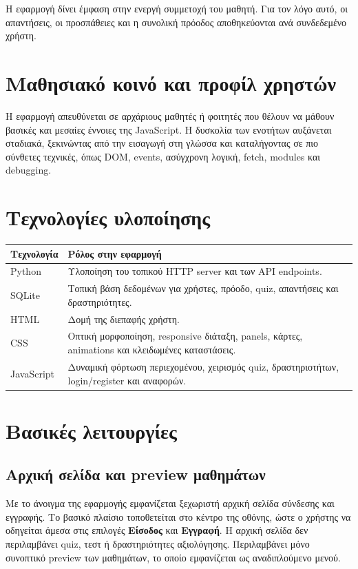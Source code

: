 \documentclass[a4paper]{article}
\newcommand{\textlatin}[1]{\textenglish{#1}}
\begin{document}
Η εφαρμογή δίνει έμφαση στην ενεργή συμμετοχή του μαθητή. Για τον λόγο αυτό, οι απαντήσεις, οι προσπάθειες και η συνολική πρόοδος αποθηκεύονται ανά συνδεδεμένο χρήστη.

\section{Μαθησιακό κοινό και προφίλ χρηστών}

Η εφαρμογή απευθύνεται σε αρχάριους μαθητές ή φοιτητές που θέλουν να μάθουν βασικές και μεσαίες έννοιες της \textlatin{JavaScript}. Η δυσκολία των ενοτήτων αυξάνεται σταδιακά, ξεκινώντας από την εισαγωγή στη γλώσσα και καταλήγοντας σε πιο σύνθετες τεχνικές, όπως \textlatin{DOM}, \textlatin{events}, ασύγχρονη λογική, \textlatin{fetch}, \textlatin{modules} και debugging.

\section{Τεχνολογίες υλοποίησης}

\begin{longtable}{|p{4cm}|p{10cm}|}
\hline
\textbf{Τεχνολογία} & \textbf{Ρόλος στην εφαρμογή} \\
\hline
\textlatin{Python} & Υλοποίηση του τοπικού \textlatin{HTTP server} και των \textlatin{API endpoints}. \\
\hline
\textlatin{SQLite} & Τοπική βάση δεδομένων για χρήστες, πρόοδο, quiz, απαντήσεις και δραστηριότητες. \\
\hline
\textlatin{HTML} & Δομή της διεπαφής χρήστη. \\
\hline
\textlatin{CSS} & Οπτική μορφοποίηση, responsive διάταξη, panels, κάρτες, animations και κλειδωμένες καταστάσεις. \\
\hline
\textlatin{JavaScript} & Δυναμική φόρτωση περιεχομένου, χειρισμός quiz, δραστηριοτήτων, login/register και αναφορών. \\
\hline
\end{longtable}

\section{Βασικές λειτουργίες}

\subsection{Αρχική σελίδα και preview μαθημάτων}

Με το άνοιγμα της εφαρμογής εμφανίζεται ξεχωριστή αρχική σελίδα σύνδεσης και εγγραφής. Το βασικό πλαίσιο τοποθετείται στο κέντρο της οθόνης, ώστε ο χρήστης να οδηγείται άμεσα στις επιλογές \textbf{Είσοδος} και \textbf{Εγγραφή}. Η αρχική σελίδα δεν περιλαμβάνει quiz, τεστ ή δραστηριότητες αξιολόγησης. Περιλαμβάνει μόνο συνοπτικό preview των μαθημάτων, το οποίο εμφανίζεται ως αναδιπλούμενο μενού.
\end{document}
